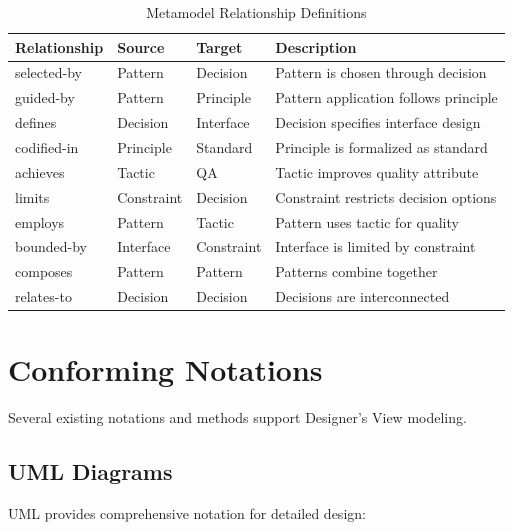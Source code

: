 \documentclass[11pt,letterpaper]{article}
\begin{document}
\begin{table}[H]
\centering
\caption{Metamodel Relationship Definitions}
\small
\begin{tabular}{@{}L{2.3cm}L{1.8cm}L{1.8cm}L{7.5cm}@{}}
\toprule
\textbf{Relationship} & \textbf{Source} & \textbf{Target} & \textbf{Description} \\
\midrule
selected-by & Pattern & Decision & Pattern is chosen through decision \\
\addlinespace
guided-by & Pattern & Principle & Pattern application follows principle \\
\addlinespace
defines & Decision & Interface & Decision specifies interface design \\
\addlinespace
codified-in & Principle & Standard & Principle is formalized as standard \\
\addlinespace
achieves & Tactic & QA & Tactic improves quality attribute \\
\addlinespace
limits & Constraint & Decision & Constraint restricts decision options \\
\addlinespace
employs & Pattern & Tactic & Pattern uses tactic for quality \\
\addlinespace
bounded-by & Interface & Constraint & Interface is limited by constraint \\
\addlinespace
composes & Pattern & Pattern & Patterns combine together \\
\addlinespace
relates-to & Decision & Decision & Decisions are interconnected \\
\bottomrule
\end{tabular}
\end{table}

\section{Conforming Notations}

Several existing notations and methods support Designer's View modeling.

\subsection{UML Diagrams}

UML provides comprehensive notation for detailed design:
\end{document}
